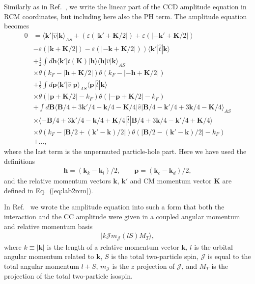 \documentclass[a4paper,12pt]{report}
\begin{document}
Similarly as in Ref.~\cite{baardsen}, we write the linear part 
of the CCD amplitude equation in RCM coordinates, but 
including here also the PH term. The amplitude equation becomes
\begin{align}
  0 &= \langle \mathbf{k}'|\hat{v}|\mathbf{k}\rangle_{AS} 
+ \left( \varepsilon(|\mathbf{k}'+\mathbf{K}/2|) 
+ \varepsilon(|-\mathbf{k}'+\mathbf{K}/2|) \right. \nonumber \\
  & \left. -\varepsilon(|\mathbf{k}+\mathbf{K}/2|) 
- \varepsilon(|-\mathbf{k}+\mathbf{K}/2|)\right)
\langle \mathbf{k}'|\hat{t}|\mathbf{k}\rangle \nonumber \\
  & + \frac{1}{2}\int d\mathbf{h}
\langle \mathbf{k}'|t(\mathbf{K})|\mathbf{h}\rangle 
\langle \mathbf{h}|\hat{v}|\mathbf{k}\rangle_{AS} \nonumber \\
  & \times \theta(k_{F}-|\mathbf{h}+\mathbf{K}/2|)
\theta(k_{F}-|-\mathbf{h}+\mathbf{K}/2|) \nonumber \\
  & + \frac{1}{2}\int d\mathbf{p}
\langle \mathbf{k}'|\hat{v}|\mathbf{p}\rangle_{AS}\langle 
\mathbf{p}|\hat{t}|\mathbf{k}\rangle \nonumber \\
  & \times \theta(|\mathbf{p}+\mathbf{K}/2|-k_{F})
\theta(|-\mathbf{p}+\mathbf{K}/2|-k_{F}) \nonumber \\
  & + \int d\mathbf{B} \langle \mathbf{B}/4
+3\mathbf{k}'/4-\mathbf{k}/4
-\mathbf{K}/4|\hat{v}|\mathbf{B}/4-\mathbf{k}'/4
+3\mathbf{k}/4-\mathbf{K}/4 \rangle_{AS} \nonumber \\
  & \times \langle -\mathbf{B}/4+3\mathbf{k}'/4
-\mathbf{k}/4+\mathbf{K}/4|\hat{t}|\mathbf{B}/4
+3\mathbf{k}/4-\mathbf{k}'/4+\mathbf{K}/4\rangle \nonumber \\
  & \times \theta(k_{F}-|\mathbf{B}/2+(\mathbf{k}'
-\mathbf{k})/2|)\theta(|\mathbf{B}/2-(\mathbf{k}'
-\mathbf{k})/2|-k_{F}) \nonumber \\
  & + \dots ,
  \label{eq:t2ampl_rcm}
\end{align} 
where the last term is the unpermuted particle-hole part. 
Here we have used the definitions 
\begin{align}
  \mathbf{h} = (\mathbf{k}_{k}-\mathbf{k}_{l})/2, 
\qquad \mathbf{p} = (\mathbf{k}_{c}-\mathbf{k}_{d})/2,
\end{align}
and the relative momentum vectors $\mathbf{k}$, $\mathbf{k}'$ 
and CM momentum vector $\mathbf{K}$ are defined in 
Eq.~(\ref{eq:lab2rcm}).

In Ref.~\cite{baardsen} we wrote the amplitude equation into such a form that both the interaction and the CC amplitude were given in a coupled angular momentum and relative momentum basis
\begin{align}
  |k\mathcal{J}m_{\mathcal{J}}(lS)M_{T}\rangle,
  \label{eq:coupled_basis}
\end{align}
where $k \equiv |\mathbf{k}|$ is the length of a relative momentum vector $\mathbf{k}$, $l$ is the orbital angular momentum related to $\mathbf{k}$, $S$ is the total two-particle spin, $\mathcal{J}$ is equal to the total angular momentum $l+S$, $m_{\mathcal{J}}$ is the $z$ projection of $\mathcal{J}$, and $M_{T}$ is the projection of the total two-particle isospin.
\end{document}
